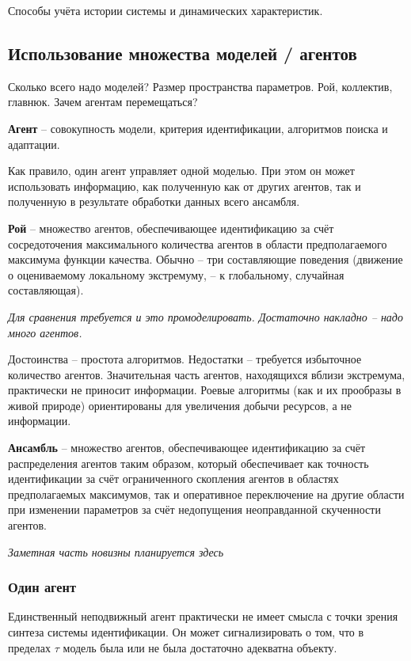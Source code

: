 \documentclass[a4paper,12pt]{article}
\begin{document}
Способы учёта истории системы и динамических характеристик.

\subsection{ Использование множества моделей / агентов}

Сколько всего надо моделей? Размер пространства параметров.
Рой, коллектив, главнюк.
Зачем агентам перемещаться?

\textbf{ Агент } -- совокупность модели, критерия идентификации,
алгоритмов поиска и адаптации.

Как правило, один агент управляет одной моделью. При этом
он может использовать информацию, как полученную как от других
агентов, так и полученную в результате обработки данных
всего ансамбля.

\textbf{ Рой } -- множество агентов, обеспечивающее идентификацию за счёт
сосредоточения максимального количества агентов
в области предполагаемого максимума функции качества.
Обычно -- три составляющие поведения
(движение о оцениваемому локальному экстремуму, -- к глобальному, случайная составляющая).

\textit{Для сравнения требуется и это промоделировать.
Достаточно накладно -- надо много агентов.}

Достоинства -- простота алгоритмов.
Недостатки -- требуется избыточное количество агентов.
Значительная часть агентов, находящихся вблизи экстремума,
практически не приносит информации. Роевые
алгоритмы (как и их прообразы в живой природе) ориентированы
для увеличения добычи ресурсов, а не информации.

\textbf{ Ансамбль } -- множество агентов, обеспечивающее идентификацию за счёт
распределения агентов таким образом, который обеспечивает как
точность идентификации за счёт ограниченного скопления агентов
в областях предполагаемых максимумов, так и оперативное переключение
на другие области при изменении параметров за счёт недопущения
неоправданной скученности агентов.

\textit{ Заметная часть новизны планируется здесь}

\subsubsection{Один агент}

Единственный неподвижный агент практически не имеет смысла
с точки зрения синтеза системы идентификации.
Он может сигнализировать о том, что в пределах
\(\tau\) модель была или не была достаточно адекватна
объекту.
\end{document}

